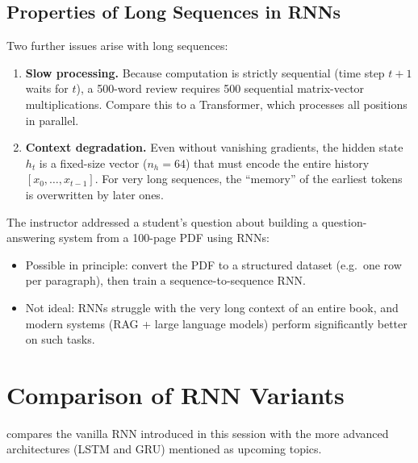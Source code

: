 \documentclass[12pt,a4paper]{article}
\begin{document}
\subsection{Properties of Long Sequences in RNNs}
\label{subsec:long_seq}

Two further issues arise with long sequences:

\begin{enumerate}[label=\arabic*.]
  \item \textbf{Slow processing.}  Because computation is strictly
        sequential (time step $t+1$ waits for $t$), a 500-word review
        requires 500 sequential matrix-vector multiplications.
        Compare this to a Transformer, which processes all positions
        in parallel.
  \item \textbf{Context degradation.}  Even without vanishing
        gradients, the hidden state $h_t$ is a fixed-size vector
        ($n_h = 64$) that must encode the entire history
        $[x_0, \ldots, x_{t-1}]$.  For very long sequences, the
        ``memory'' of the earliest tokens is overwritten by later ones.
\end{enumerate}

The instructor addressed a student's question about building a
question-answering system from a 100-page PDF using RNNs:

\begin{itemize}
  \item Possible in principle: convert the PDF to a structured dataset
        (e.g.\ one row per paragraph), then train a sequence-to-sequence
        RNN.
  \item Not ideal: RNNs struggle with the very long context of an entire
        book, and modern systems (RAG + large language models) perform
        significantly better on such tasks.
\end{itemize}

\section{Comparison of RNN Variants}
\label{sec:rnn_variants}

 compares the vanilla RNN introduced in this
session with the more advanced architectures (LSTM and GRU) mentioned
as upcoming topics.
\end{document}
